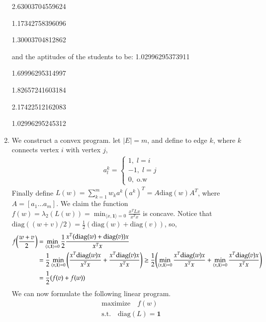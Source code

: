 \documentclass[12pt]{article}
\theoremstyle{definitionstyle}
\renewcommand{\ip}[1]{\langle #1 \rangle}
\begin{document}
\begin{enumerate}[leftmargin=\labelsep]
		2.63003704559624
		
		1.17342758396096
		
		1.30003704812862
		
		and the aptitudes of the students to be:
		1.02996295373911
		
		1.69996295314997
		
		1.82657241603184
		
		2.17422512162083
		
		1.02996295245312
		
		\item We construct a convex program. let $|E| = m$, and define to edge $k$, where $k$ connects vertex $i$ with vertex $j$,
		\begin{align*}
			a^k_l = \begin{cases}
				1, \; l = i \\
				-1, \; l = j \\
				0, \; \text{o.w}
			\end{cases}
		\end{align*}
		Finally define $L(w) = \sum_{k=1}^m w_k a^k (a^k)^T = A\mathrm{diag}(w)A^T$, where $A = [a_1 \ldots a_m]$. We claim the function $f(w) = \lambda_2(L(w)) = \min_{\ip{x, \textbf{1}} = 0} \frac{x^TLx}{x^Tx}$ is concave. Notice that $\mathrm{diag}((w+v)/2) = \frac12 (\mathrm{diag}(w) + \mathrm{diag}(v))$, so,
		\begin{align*}
			f\qty(\frac{w+v}{2}) &= \min_{\ip{x, \mathbf 1} = 0} \frac12 \frac{x^T(\mathrm{diag}(w) + \mathrm{diag}(v))x}{x^Tx} \\
			&= \frac12 \min_{\ip{x, \mathbf 1} = 0} \qty( \frac{x^T\mathrm{diag}(w)x}{x^Tx} + \frac{x^T\mathrm{diag}(v)x}{x^Tx}) \geq \frac12 \qty(\min_{\ip{x, \mathbf 1} = 0}  \frac{x^T\mathrm{diag}(w)x}{x^Tx} + \min_{\ip{x, \mathbf 1} = 0}  \frac{x^T\mathrm{diag}(v)x}{x^Tx}) \\
			&= \frac12(f(v)+f(w))
		\end{align*}
		We can now formulate the following linear program.
		\begin{align*}
			\text{maximize} \quad f(w) \\
			\text{s.t.} \quad \mathrm{diag}(L) = \mathbf 1
		\end{align*}

\end{enumerate}
\end{document}

